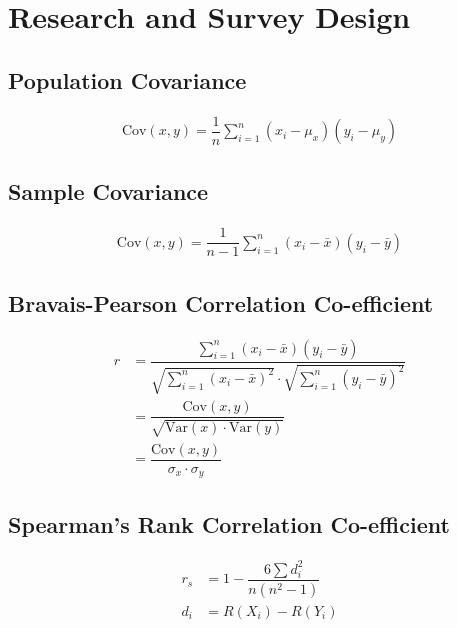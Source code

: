 \documentclass[../main.tex]{subfile}
\begin{document}
    \chapter{Research and Survey Design}
    \section{Population Covariance}
    \begin{align}
        \text{Cov}(x,y)=\dfrac{1}{n} \sum_{i=1}^n (x_i-\mu_x)(y_i-\mu_y)
    \end{align}
    \section{Sample Covariance}
    \begin{align}
        \text{Cov}(x,y)=\dfrac{1}{n-1} \sum_{i=1}^n (x_i-\bar{x})(y_i-\bar{y})
    \end{align}
    \section{Bravais-Pearson Correlation Co-efficient}
    \begin{align}
        r &= \dfrac{\sum_{i=1}^n (x_i-\bar{x})(y_i-\bar{y})}{\sqrt{\sum_{i=1}^n (x_i-\bar{x})^2} \cdot \sqrt{\sum_{i=1}^n (y_i -\bar{y})^2}}\\
        & = \dfrac{\text{Cov}(x,y)}{\sqrt{\text{Var}(x) \cdot \text{Var}(y)}}\\
        & = \dfrac{\text{Cov}(x,y)}{\sigma_x \cdot \sigma_y}
    \end{align}
    \section{Spearman's Rank Correlation  	Co-efficient}
    \begin{align}
        r_s & = 1-\dfrac{6 \sum d_i^2}{n\left(n^2-1\right)}\\
        d_i &= R(X_i) - R(Y_i)
    \end{align}
\end{document}
